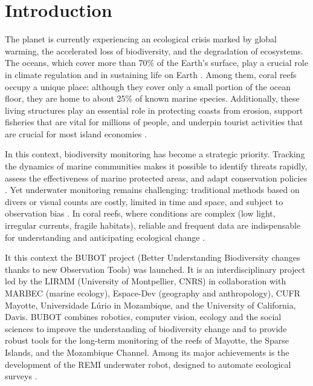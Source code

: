 \resetgraphicspath
{}

\chapter{Introduction}
\label{chap:introduction}
The planet is currently experiencing an ecological crisis marked by global warming, the accelerated loss of biodiversity, and the degradation of ecosystems. The oceans, which cover more than 70\% of the Earth's surface, play a crucial role in climate regulation and in sustaining life on Earth \cite{Pendleton2020,Visbeck2018}. Among them, coral reefs occupy a unique place: although they cover only a small portion of the ocean floor, they are home to about 25\% of known marine species. Additionally, these living structures play an essential role in protecting coasts from erosion, support fisheries that are vital for millions of people, and underpin tourist activities that are crucial for most island economies \cite{Ferrario2014,Spalding2017,Plaisance2011}.

In this context, biodiversity monitoring has become a strategic priority. Tracking the dynamics of marine communities makes it possible to identify threats rapidly, assess the effectiveness of marine protected areas, and adapt conservation policies \cite{HoeghGuldberg2017,Yuan2024}. Yet underwater monitoring remains challenging: traditional methods based on divers or visual counts are costly, limited in time and space, and subject to observation bias \cite{Edgar2004}. In coral reefs, where conditions are complex (low light, irregular currents, fragile habitats), reliable and frequent data are indispensable for understanding and anticipating ecological change \cite{Maslin2021}.

It this context the BUBOT project (Better Understanding Biodiversity changes thanks to new Observation Tools) was launched. It is an interdisciplinary project led by the LIRMM (University of Montpellier, CNRS) in collaboration with MARBEC (marine ecology), Espace-Dev (geography and anthropology), CUFR Mayotte, Universidade Lúrio in Mozambique, and the University of California, Davis. BUBOT combines robotics, computer vision, ecology and the social sciences to improve the understanding of biodiversity change and to provide robust tools for the long-term monitoring of the reefs of Mayotte, the Sparse Islands, and the Mozambique Channel. Among its major achievements is the development of the REMI underwater robot, designed to automate ecological surveys \cite{Hereau2020}.

